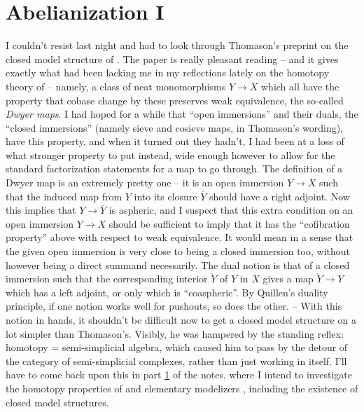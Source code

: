 









\chapter{Abelianization I}
\label{ch:V}

\presectionfill{}\par

\label{sec:87}%
I couldn't resist last night and had to look through Thomason's
preprint on the closed model structure of
\Cat. The paper is really pleasant
reading -- and it gives exactly what had been lacking me in my
reflections lately on the homotopy theory of \Cat{} -- namely, a class
of neat monomorphisms $Y\to X$ which all have the property that cobase
change by these preserves weak equivalence, the so-called \emph{Dwyer
  maps}. I
had hoped for a while that ``open immersions'' and their duals, the
``closed immersions'' (namely sieve and cosieve maps, in Thomason's
wording), have this property, and when it turned out they hadn't, I
had been at a loss of what stronger property to put instead, wide
enough however to allow for the standard factorization statements for
a map to go through. The definition of a Dwyer map is an extremely
pretty one -- it is an open immersion $Y\to X$ such that the induced
map from $Y$ into its closure $\overline Y$ should have a right
adjoint. Now this implies that $Y\to\overline Y$ is aspheric, and I
suspect that this extra condition on an open immersion $Y\to X$ should
be sufficient to imply that it has the ``cofibration property'' above
with respect to weak equivalence. It would mean in a sense that the
given open immersion is very close to being a closed immersion too,
without however being a direct summand necessarily. The dual notion is
that of a closed immersion such that the corresponding interior
$\mathring Y$ of $Y$ in $X$ gives a map $\mathring Y \to Y$ which has
a left adjoint, or only which is ``coaspheric''. By Quillen's duality
principle, if one notion works well for pushouts, so does the
other. -- With this notion in hands, it shouldn't be difficult now to
get a closed model structure on \Cat{} a lot simpler than
Thomason's. Visibly, he was hampered by the standing reflex: homotopy
= semi-simplicial algebra, which caused him to pass by the detour of
the category \Simplexhat{} of semi-simplicial complexes, rather than
just working in \Cat{} itself. I'll have to come back upon this in
part \ref{ch:V} of the notes, where I intend to investigate the
homotopy properties of \Cat{} and elementary modelizers \Ahat,
including the existence of closed model structures.

